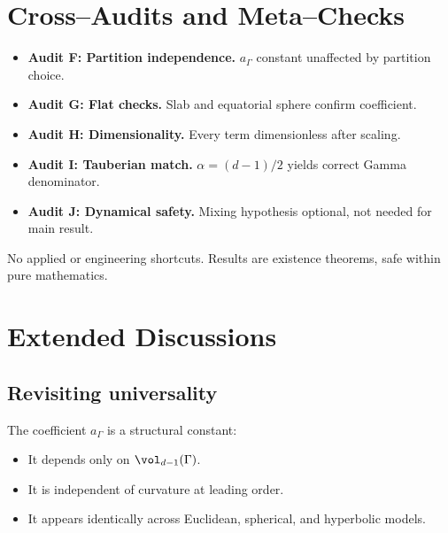 \section{Cross–Audits and Meta–Checks}
\label{sec:audits}

\begin{itemize}
  \item \textbf{Audit F: Partition independence.} $a_\Gamma$ constant unaffected by partition choice.
  \item \textbf{Audit G: Flat checks.} Slab and equatorial sphere confirm coefficient.
  \item \textbf{Audit H: Dimensionality.} Every term dimensionless after scaling.
  \item \textbf{Audit I: Tauberian match.} $\alpha=(d-1)/2$ yields correct Gamma denominator.
  \item \textbf{Audit J: Dynamical safety.} Mixing hypothesis optional, not needed for main result.
\end{itemize}

\begin{remark}[Clarity]
No applied or engineering shortcuts. Results are existence theorems, safe within pure mathematics.
\end{remark}


\section{Extended Discussions}
\label{sec:discussion}

\subsection{Revisiting universality}
The coefficient $a_\Gamma$ is a structural constant:
\begin{itemize}
  \item It depends only on $\vol_{d-1}(\Gamma)$.
  \item It is independent of curvature at leading order.
  \item It appears identically across Euclidean, spherical, and hyperbolic models.
\end{itemize}

